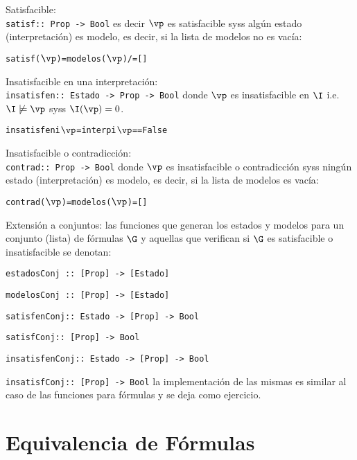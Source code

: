 \documentclass[11pt,letterpaper]{article}
\begin{document}
\item Satisfacible: \\
\verb~satisf:: Prop -> Bool~ es decir $\vp$ es satisfacible syss 
alg\'un estado (interpretaci\'on) es modelo, es decir, si la lista de modelos 
no es vac\'ia:
\begin{alltt}
 satisf(\(\vp\)) = modelos(\(\vp\)) /= []
\end{alltt}

\item Insatisfacible en una interpretaci\'on:\\
\verb~insatisfen:: Estado -> Prop -> Bool~ donde $\vp$ es insatisfacible en 
$\I$ i.e. $\I\not\models\vp$  syss $\I(\vp)=0$. 
\begin{alltt}
insatisfen i \(\vp\) = interp i \(\vp\) == False 
\end{alltt}

\item Insatisfacible o contradicci\'on: \\
\verb~contrad:: Prop -> Bool~ donde $\vp$ es insatisfacible o contradicci\'on 
syss ning\'un estado (interpretaci\'on) es modelo, es decir, si la lista de 
modelos es vac\'ia:
\begin{alltt}
contrad(\(\vp\)) = modelos(\(\vp\)) = [] 
\end{alltt}

\item Extensi\'on a conjuntos: las funciones que generan los estados y modelos 
para un conjunto (lista) de f\'ormulas $\G$ y aquellas que verifican si 
$\G$ es satisfacible o insatisfacible se denotan:
\bi
\item \verb~estadosConj :: [Prop] -> [Estado]~
\item \verb~modelosConj :: [Prop] -> [Estado]~
\item \verb~satisfenConj:: Estado -> [Prop] -> Bool~
\item \verb~satisfConj:: [Prop] -> Bool~
\item \verb~insatisfenConj:: Estado -> [Prop] -> Bool~
\item \verb~insatisfConj:: [Prop] -> Bool~
\ei
la implementaci\'on de las mismas es similar al caso de las funciones para 
f\'ormulas y se deja como ejercicio.
\ei


\section{Equivalencia de F\'ormulas}
\end{document}
